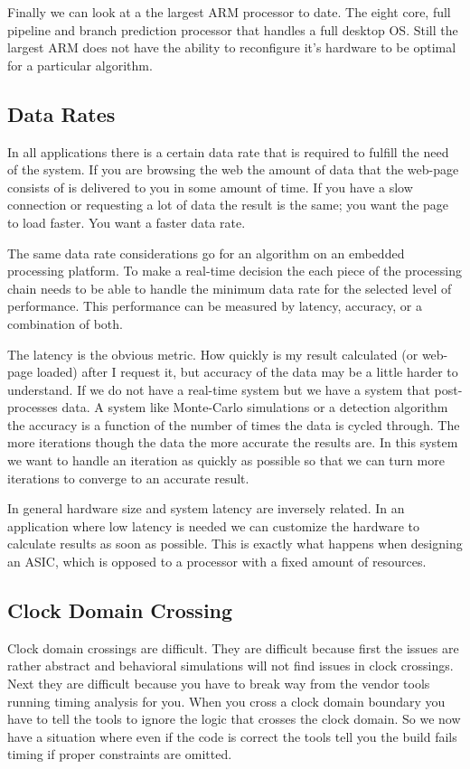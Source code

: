 Finally we can look at a the largest \ac{ARM} processor to date. The eight core, full pipeline and branch prediction processor that handles a full desktop \ac{OS}. Still the largest \ac{ARM} does not have the ability to reconfigure it's hardware to be optimal for a particular algorithm.

\subsection{Data Rates}
	
In all applications there is a certain data rate that is required to fulfill the need of the system. If you are browsing the web the amount of data that the web-page consists of is delivered to you in some amount of time. If you have a slow connection or requesting a lot of data the result is the same; you want the page to load faster. You want a faster data rate.

The same data rate considerations go for an algorithm on an embedded processing platform. To make a real-time decision the each piece of the processing chain needs to be able to handle the minimum data rate for the selected level of performance. This performance can be measured by latency, accuracy, or a combination of both. 

The latency is the obvious metric. How quickly is my result calculated (or web-page loaded) after I request it, but accuracy of the data may be a little harder to understand. If we do not have a real-time system but we have a system that post-processes data. A system like Monte-Carlo simulations or a detection algorithm the accuracy is a function of the number of times the data is cycled through. The more iterations though the data the more accurate the results are. In this system we want to handle an iteration as quickly as possible so that we can turn more iterations to converge to an accurate result. 
	
In general hardware size and system latency are inversely related. In an application where low latency is needed we can customize the hardware to calculate results as soon as possible. This is exactly what happens when designing an \ac{ASIC}, which is opposed to a processor with a fixed amount of resources. 

\subsection{Clock Domain Crossing}
\label{sec:clkcross}
Clock domain crossings are difficult. They are difficult because first the issues are rather abstract and behavioral simulations will not find issues in clock crossings. Next they are difficult because you have to break way from the vendor tools running timing analysis for you. When you cross a clock domain boundary you have to tell the tools to ignore the logic that crosses the clock domain. So we now have a situation where even if the code is correct the tools tell you the build fails timing if proper constraints are omitted. 

